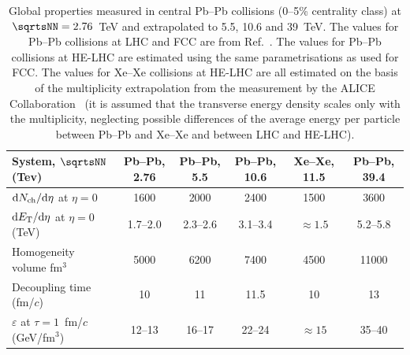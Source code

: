 \documentclass[../report.tex]{subfiles}
\begin{document}
\begin{table}[!t]
\caption{Global properties measured in central Pb--Pb collisions (0--5\% centrality class) at $\sqrtsNN=2.76$~TeV and extrapolated to 5.5, 10.6 and 39~TeV. The values for Pb--Pb collisions at LHC and FCC are from Ref.~\cite{Dainese:2016gch}. The values for Pb--Pb collisions at HE-LHC are estimated using the same parametrisations as used for FCC. The values for Xe--Xe collisions at HE-LHC are all estimated on the basis of the multiplicity extrapolation from the measurement by the ALICE Collaboration~\cite{Acharya:2018hhy} (it is assumed that the transverse energy density scales only with the multiplicity, neglecting possible differences of the average energy per particle between Pb--Pb and Xe--Xe and between LHC and HE-LHC).}
\small
\begin{center}
\begin{tabular}{lccccc}
\hline
System, $\sqrtsNN$ (Tev) & Pb--Pb, 2.76 & Pb--Pb, 5.5 & Pb--Pb, 10.6 & Xe--Xe, 11.5 & Pb--Pb, 39.4 \\
\hline
${\rm d}N_{\rm ch}/{\rm d}\eta$ at $\eta=0$ & 1600 & 2000 & 2400 & 1500  & 3600 \\
${\rm d}E_{\rm T}/{\rm d}\eta$ at $\eta=0$ (TeV) & 1.7--2.0 & 2.3--2.6 & 3.1--3.4 & $\approx 1.5$ &  5.2--5.8 \\
Homogeneity volume fm$^3$ & 5000  & 6200 & 7400 & 4500 & 11000 \\
Decoupling time (fm/$c$) & 10 &  11 & 11.5 & 10 & 13 \\
$\varepsilon$ at $\tau=1$~fm/$c$ (GeV/fm$^3$) & 12--13  & 16--17 & 22--24 & $\approx 15$ & 35--40 \\
\hline
\end{tabular}
\end{center}
\label{tab:PbPb}
\end{table}




 
\end{document}
